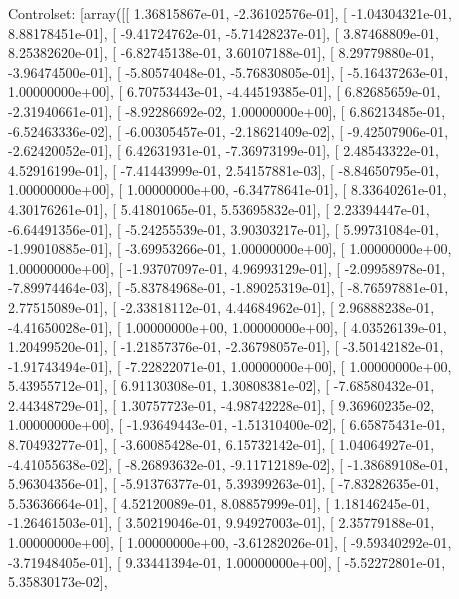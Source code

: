 \documentclass{article}
\begin{document}
Controlset: [array([[  1.36815867e-01,  -2.36102576e-01],
       [ -1.04304321e-01,   8.88178451e-01],
       [ -9.41724762e-01,  -5.71428237e-01],
       [  3.87468809e-01,   8.25382620e-01],
       [ -6.82745138e-01,   3.60107188e-01],
       [  8.29779880e-01,  -3.96474500e-01],
       [ -5.80574048e-01,  -5.76830805e-01],
       [ -5.16437263e-01,   1.00000000e+00],
       [  6.70753443e-01,  -4.44519385e-01],
       [  6.82685659e-01,  -2.31940661e-01],
       [ -8.92286692e-02,   1.00000000e+00],
       [  6.86213485e-01,  -6.52463336e-02],
       [ -6.00305457e-01,  -2.18621409e-02],
       [ -9.42507906e-01,  -2.62420052e-01],
       [  6.42631931e-01,  -7.36973199e-01],
       [  2.48543322e-01,   4.52916199e-01],
       [ -7.41443999e-01,   2.54157881e-03],
       [ -8.84650795e-01,   1.00000000e+00],
       [  1.00000000e+00,  -6.34778641e-01],
       [  8.33640261e-01,   4.30176261e-01],
       [  5.41801065e-01,   5.53695832e-01],
       [  2.23394447e-01,  -6.64491356e-01],
       [ -5.24255539e-01,   3.90303217e-01],
       [  5.99731084e-01,  -1.99010885e-01],
       [ -3.69953266e-01,   1.00000000e+00],
       [  1.00000000e+00,   1.00000000e+00],
       [ -1.93707097e-01,   4.96993129e-01],
       [ -2.09958978e-01,  -7.89974464e-03],
       [ -5.83784968e-01,  -1.89025319e-01],
       [ -8.76597881e-01,   2.77515089e-01],
       [ -2.33818112e-01,   4.44684962e-01],
       [  2.96888238e-01,  -4.41650028e-01],
       [  1.00000000e+00,   1.00000000e+00],
       [  4.03526139e-01,   1.20499520e-01],
       [ -1.21857376e-01,  -2.36798057e-01],
       [ -3.50142182e-01,  -1.91743494e-01],
       [ -7.22822071e-01,   1.00000000e+00],
       [  1.00000000e+00,   5.43955712e-01],
       [  6.91130308e-01,   1.30808381e-02],
       [ -7.68580432e-01,   2.44348729e-01],
       [  1.30757723e-01,  -4.98742228e-01],
       [  9.36960235e-02,   1.00000000e+00],
       [ -1.93649443e-01,  -1.51310400e-02],
       [  6.65875431e-01,   8.70493277e-01],
       [ -3.60085428e-01,   6.15732142e-01],
       [  1.04064927e-01,  -4.41055638e-02],
       [ -8.26893632e-01,  -9.11712189e-02],
       [ -1.38689108e-01,   5.96304356e-01],
       [ -5.91376377e-01,   5.39399263e-01],
       [ -7.83282635e-01,   5.53636664e-01],
       [  4.52120089e-01,   8.08857999e-01],
       [  1.18146245e-01,  -1.26461503e-01],
       [  3.50219046e-01,   9.94927003e-01],
       [  2.35779188e-01,   1.00000000e+00],
       [  1.00000000e+00,  -3.61282026e-01],
       [ -9.59340292e-01,  -3.71948405e-01],
       [  9.33441394e-01,   1.00000000e+00],
       [ -5.52272801e-01,   5.35830173e-02],
\end{document}
